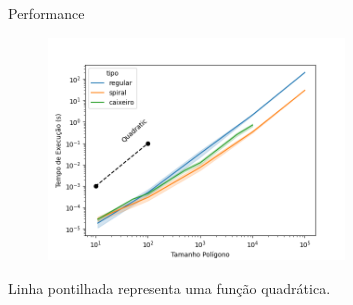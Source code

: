 \documentclass[aspectratio=169,usenames,dvipsnames]{beamer}
\begin{document}
\begin{frame}{Performance}
  \begin{figure}
    \includegraphics[width=0.7\textwidth]{figures/performance.png}
  \end{figure}
  \begin{center}
  Linha pontilhada representa uma função quadrática.
  \end{center}
\end{frame}
\end{document}
